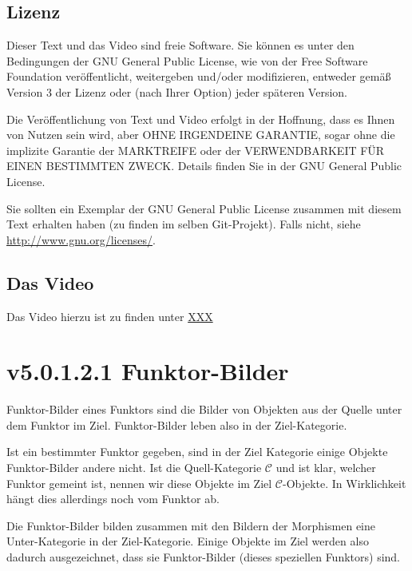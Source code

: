 \documentclass[a4paper]{amsart}
\theoremstyle{definition}
\newcommand{\CC}{\ensuremath{\mathcal{ C }}}
\begin{document}
\subsection*{Lizenz}
Dieser Text und das Video sind freie Software. Sie können es unter den Bedingungen der
GNU General Public License, wie von der Free Software Foundation veröffentlicht, weitergeben
und/oder modifizieren, entweder gemäß Version 3 der Lizenz oder (nach Ihrer Option) jeder späteren Version.

Die Veröffentlichung von Text und Video erfolgt in der Hoffnung, dass es Ihnen von Nutzen sein wird,
aber OHNE IRGENDEINE GARANTIE, sogar ohne die implizite Garantie der MARKTREIFE oder der
VERWENDBARKEIT FÜR EINEN BESTIMMTEN ZWECK. Details finden Sie in der GNU General Public License.

Sie sollten ein Exemplar der GNU General Public License zusammen mit diesem Text erhalten haben
(zu finden im selben Git-Projekt).
Falls nicht, siehe \url{http://www.gnu.org/licenses/}.

\subsection*{Das Video}
Das Video hierzu ist zu finden unter
{\tiny
   \url{XXX}
}

\section{v5.0.1.2.1 Funktor-Bilder}
Funktor-Bilder eines Funktors sind die Bilder von Objekten aus der Quelle unter dem Funktor im Ziel. Funktor-Bilder leben also in der Ziel-Kategorie.

Ist ein bestimmter Funktor gegeben, sind in der Ziel Kategorie einige Objekte Funktor-Bilder andere nicht. Ist die Quell-Kategorie $\CC$ und ist klar, welcher Funktor gemeint ist, nennen wir diese Objekte im Ziel $\CC$-Objekte. In Wirklichkeit hängt dies allerdings noch vom Funktor ab. 

Die Funktor-Bilder bilden zusammen mit den Bildern der Morphismen eine Unter-Kategorie in der Ziel-Kategorie. Einige Objekte im Ziel werden also dadurch ausgezeichnet, dass sie Funktor-Bilder (dieses speziellen Funktors) sind.
\end{document}
